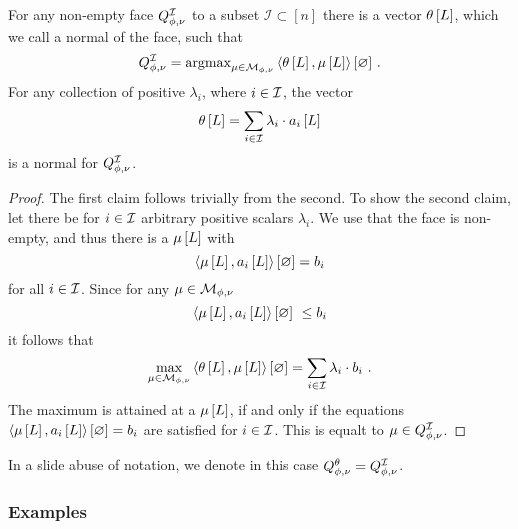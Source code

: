 \begin{theorem}\label{the:faceNormal}
	For any non-empty face $Q^{\mathcal{I}}_{\phi,\nu}$ to a subset $\mathcal{I}\subset[n]$ there is a vector $\theta\left[L\right]$, which we call a normal of the face, such that
		\[ Q^{\mathcal{I}}_{\phi,\nu} = \mathrm{argmax}_{\mu\in\mathcal{M}_{\phi,\nu}} \left\langle \theta\left[L\right],\mu\left[L\right]\right\rangle \left[ \varnothing \right]  \, . \]
	For any collection of positive $\lambda_i$, where $i\in\mathcal{I}$, the vector
		\[ \theta\left[L\right] = \sum_{i\in\mathcal{I}} \lambda_i\cdot a_{i}\left[L\right]\]
	is a normal for $Q^{\mathcal{I}}_{\phi,\nu}$.		
\end{theorem}
\begin{proof}
	The first claim follows trivially from the second.
	To show the second claim, let there be for $i\in\mathcal{I}$ arbitrary positive scalars $\lambda_i$.
	We use that the face is non-empty, and thus there is a $\mu\left[L\right]$ with
		\[ \left\langle \mu\left[L\right],a_{i}\left[L\right]\right\rangle \left[ \varnothing \right]=b_{i} \]
	for all $i\in\mathcal{I}$.
	Since for any $\mu\in\mathcal{M}_{\phi,\nu}$ 
		\[ \contraction{\meanparamat{\selvariable},\normalvecofat{i}{\selvariable}} \leq \normalboundof{i} \]
	it follows that
		\[ \max_{\mu\in\mathcal{M}_{\phi,\nu}} \left\langle \theta\left[L\right],\mu\left[L\right]\right\rangle \left[ \varnothing \right] 
		= \sum_{i\in\mathcal{I}} \lambda_i \cdot b_{i} \, \, . \]
	The maximum is attained at a $\mu\left[L\right]$, if and only if the equations $\left\langle \mu\left[L\right],a_{i}\left[L\right]\right\rangle \left[ \varnothing \right]=b_{i}$ are satisfied for $i\in\mathcal{I}$.
	This is equalt to $\mu\in Q^{\mathcal{I}}_{\phi,\nu}$.
\end{proof}

In a slide abuse of notation, we denote in this case $Q^{\theta}_{\phi,\nu} = Q^{\mathcal{I}}_{\phi,\nu}$.




\subsubsection{Examples}

